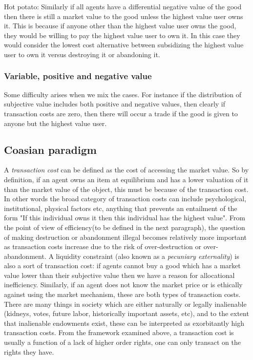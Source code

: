 \documentclass[12pt]{report}
\numberwithin{equation}{section}
\begin{document}
Hot potato: Similarly if all agents have a differential negative value of the good then there is still a market value to the good unless the highest value user owns it. This is because if anyone other than the highest value user owns the good, they would be willing to pay the highest value user to own it. In this case they would consider the lowest cost alternative between subsidizing the highest value user to own it versus destroying it or abandoning it.

\subsubsection{Variable, positive and negative value}

Some difficulty arises when we mix the cases. For instance if the distribution of subjective value includes both positive and negative values, then clearly if transaction costs are zero, then there will occur a trade if the good is given to anyone but the highest value user.

\subsection{Coasian paradigm}\label{coase}

A \textit{transaction cost} can be defined as the cost of accessing the market value. So by definition, if an agent owns an item at equilibrium and has a lower valuation of it than the market value of the object, this must be because of the transaction cost. In other words the broad category of transaction costs can include psychological, institutional, physical factors etc, anything that prevents an entailment of the form "If this individual owns it then this individual has the highest value". From the point of view of efficiency(to be defined in the next paragraph), the question of making destruction or abandonment illegal becomes relatively more important as transaction costs increase due to the risk of over-destruction or over-abandonment. A liquidity constraint (also known as a \textit{pecuniary externality}) is also a sort of transaction cost: if agents cannot buy a good which has a market value lower than their subjective value then we have a reason for allocational inefficiency. Similarly, if an agent does not know the market price or is ethically against using the market mechanism, these are both types of transaction costs. There are many things in society which are either naturally or legally inalienable (kidneys, votes, future labor, historically important assets, etc), and to the extent that inalienable endowments exist, these can be interpreted as exorbitantly high transaction costs. From the framework examined above, a transaction cost is usually a function of a lack of higher order rights, one can only transact on the rights they have.
\end{document}
